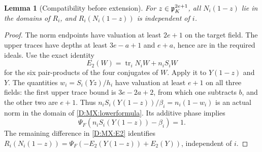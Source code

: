 \documentclass[11pt]{amsart}
\newtheorem{lemma}[theorem]{Lemma}
\theoremstyle{definition}
\theoremstyle{remark}
\begin{document}
\begin{lemma}[Compatibility before extension]\label{D:MX:Rcompat}
For $z\in\mathfrak p_K^{2e+1}$, all $N_i(1-z)$ lie in the domains of $R_i$,
and $R_i(N_i(1-z))$ is independent of $i$.
\end{lemma}
\begin{proof}
The norm endpoints have valuation at least $2e+1$ on the target field.
The upper traces have depths at least $3e-a+1$ and $e+a$, hence are in
the required ideals. Use the exact identity
\begin{equation}\label{D:MX:E2}
 E_2(W)=\operatorname{tr}_i N_iW+n_iS_iW
\end{equation}
for the six pair-products of the four conjugates of $W$.
Apply it to $Y(1-z)$ and $Y$.
The quantities $w_i=S_i(Yz)/h_i$ have valuation at least $e+1$ on all
three fields: the first upper trace bound is $3e-2a+2$, from which one
subtracts $b$, and the other two are $e+1$.
Thus $n_iS_i(Y(1-z))/\beta_i=n_i(1-w_i)$ is an actual norm in the domain
of \eqref{D:MX:lowerformula}. Its additive phase implies
\[
 \Psi_F(n_iS_i(Y(1-z))-\beta_i)=1.
\]
The remaining difference in \eqref{D:MX:E2} identifies
$R_i(N_i(1-z))=\Psi_F(-E_2(Y(1-z))+E_2(Y))$, independent of $i$.
\end{proof}
\end{document}
